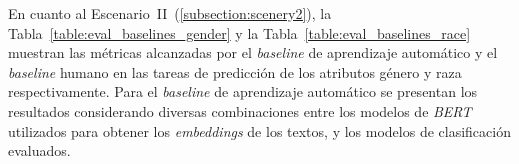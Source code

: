 \begin{table}[htpb]
    \centering
    \caption{Resumen de m\'etricas de concordancia entre \emph{ChatGPT} y el corpus final.}
    \label{table:agreement_gpt}
\end{table}

En cuanto al Escenario~II~(\ref{subsection:scenery2}), la Tabla~\ref{table:eval_baselines_gender} y la Tabla~\ref{table:eval_baselines_race}
muestran las m\'etricas alcanzadas por el \emph{baseline} de aprendizaje autom\'atico y el \emph{baseline} humano en las tareas de 
predicci\'on de los atributos g\'enero y raza respectivamente. Para el \emph{baseline} de aprendizaje autom\'atico se presentan 
los resultados considerando diversas combinaciones entre los modelos de \emph{BERT} utilizados para obtener los 
\emph{embeddings} de los textos, y los modelos de clasificaci\'on evaluados. 

